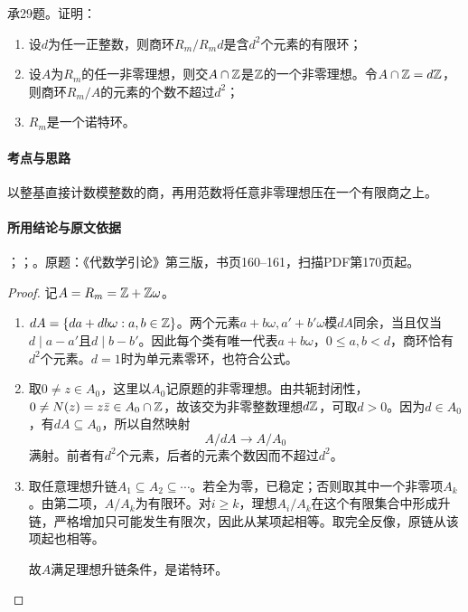 承29题。证明：
\begin{enumerate}[label=(\roman*)]
\item 设$d$为任一正整数，则商环$R_m/R_md$是含$d^2$个元素的有限环；
\item 设$A$为$R_m$的任一非零理想，则交$A\cap\mathbb Z$是$\mathbb Z$的一个非零理想。令$A\cap\mathbb Z=d\mathbb Z$，则商环$R_m/A$的元素的个数不超过$d^2$；
\item $R_m$是一个诺特环。
\end{enumerate}

\paragraph{考点与思路}

以整基直接计数模整数的商，再用范数将任意非零理想压在一个有限商之上。

\paragraph{所用结论与原文依据}

；；。原题：《代数学引论》第三版，书页160--161，扫描PDF第170页起。


\begin{proof}

记$A=R_m=\mathbb Z+\mathbb Z\omega$。
\begin{enumerate}[label=(\roman*)]
\item $dA=\{da+db\omega:a,b\in\mathbb Z\}$。两个元素$a+b\omega,a'+b'\omega$模$dA$同余，当且仅当$d\mid a-a'$且$d\mid b-b'$。因此每个类有唯一代表$a+b\omega$，$0\le a,b<d$，商环恰有$d^2$个元素。$d=1$时为单元素零环，也符合公式。
\item 取$0\ne z\in A_0$，这里以$A_0$记原题的非零理想。由共轭封闭性，$0\ne N(z)=z\bar z\in A_0\cap\mathbb Z$，故该交为非零整数理想$d\mathbb Z$，可取$d>0$。因为$d\in A_0$，有$dA\subseteq A_0$，所以自然映射
\[
A/dA\longrightarrow A/A_0
\]
满射。前者有$d^2$个元素，后者的元素个数因而不超过$d^2$。
\item 取任意理想升链$A_1\subseteq A_2\subseteq\cdots$。若全为零，已稳定；否则取其中一个非零项$A_k$。由第二项，$A/A_k$为有限环。对$i\ge k$，理想$A_i/A_k$在这个有限集合中形成升链，严格增加只可能发生有限次，因此从某项起相等。取完全反像，原链从该项起也相等。

故$A$满足理想升链条件，是诺特环。
\end{enumerate}

\end{proof}

